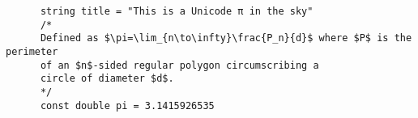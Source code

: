 \documentclass{article}
\begin{document}
    \begin{verbatim}
      string title = "This is a Unicode π in the sky"
      /*
      Defined as $\pi=\lim_{n\to\infty}\frac{P_n}{d}$ where $P$ is the perimeter
      of an $n$-sided regular polygon circumscribing a
      circle of diameter $d$.
      */
      const double pi = 3.1415926535
    \end{verbatim}
    
\end{document}
